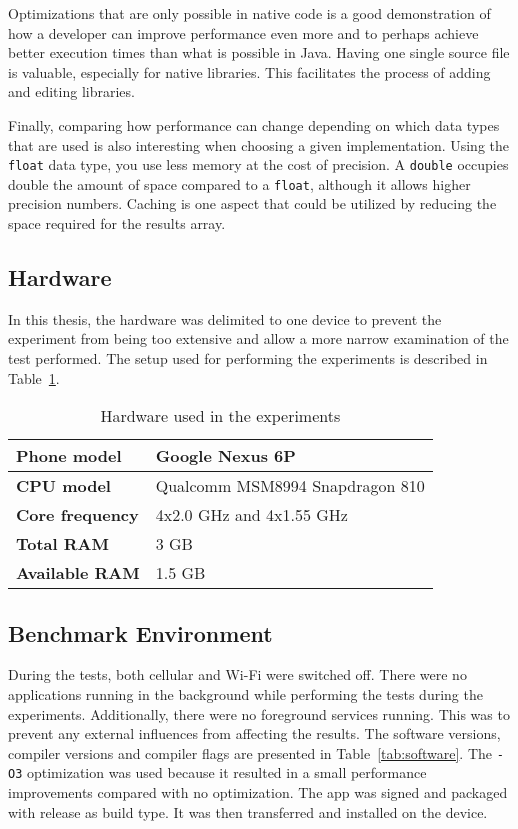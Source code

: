 Optimizations that are only possible in native code is a good demonstration of how a developer can improve performance even more and to perhaps achieve better execution times than what is possible in Java. Having one single source file is valuable, especially for native libraries. This facilitates the process of adding and editing libraries.

Finally, comparing how performance can change depending on which data types that are used is also interesting when choosing a given implementation. Using the \texttt{float} data type, you use less memory at the cost of precision. A \texttt{double} occupies double the amount of space compared to a \texttt{float}, although it allows higher precision numbers. Caching is one aspect that could be utilized by reducing the space required for the results array.

\subsection{Hardware}
In this thesis, the hardware was delimited to one device to prevent the experiment from being too extensive and allow a more narrow examination of the test performed. The setup used for performing the experiments is described in Table~\ref{tab:hardware}.

\ifrelease
\begin{table}[H]
    \centering
    \caption{Hardware used in the experiments}
    \label{tab:hardware}
    \begin{tabular}{|l|l|}
        \hline
        \textbf{Phone model} & Google Nexus 6P\\
        \hline
        \textbf{CPU model} & Qualcomm MSM8994 Snapdragon 810\\
        \hline
        \textbf{Core frequency} & 4x2.0 GHz and 4x1.55 GHz\\
        \hline
        \textbf{Total RAM} & 3 GB\\
        \hline
        \textbf{Available RAM} & 1.5 GB\\
        \hline
    \end{tabular}
\end{table}
\fi


\subsection{Benchmark Environment}
During the tests, both cellular and Wi-Fi were switched off. There were no applications running in the background while performing the tests during the experiments. Additionally, there were no foreground services running. This was to prevent any external influences from affecting the results. The software versions, compiler versions and compiler flags are presented in Table~\ref{tab:software}. The \texttt{-O3} optimization was used because it resulted in a small performance improvements compared with no optimization. The app was signed and packaged with release as build type. It was then transferred and installed on the device.

